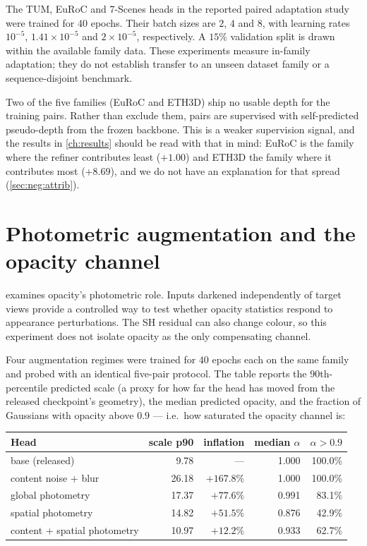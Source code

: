 The TUM, EuRoC and 7-Scenes heads in the reported paired adaptation study
were trained for $40$ epochs. Their batch sizes are $2$, $4$ and $8$, with
learning rates $10^{-5}$, $1.41\times10^{-5}$ and $2\times10^{-5}$,
respectively. A $15\%$ validation split is drawn within the available family
data. These experiments measure in-family adaptation; they do not establish
transfer to an unseen dataset family or a sequence-disjoint benchmark.

Two of the five families (EuRoC and ETH3D) ship no usable depth for the
training pairs. Rather than exclude them, pairs are supervised with
self-predicted pseudo-depth from the frozen backbone. This is a weaker
supervision signal, and the results in \cref{ch:results} should be read with
that in mind: EuRoC is the family where the refiner contributes least
($+1.00$\dB) and ETH3D the family where it contributes most ($+8.69$\dB),
and we do not have an explanation for that spread
(\cref{sec:neg:attrib}).

\section{Photometric augmentation and the opacity channel}
\label{sec:adapt:aug}

 examines opacity's photometric role. Inputs darkened
independently of target views provide a controlled way to test whether
opacity statistics respond to appearance perturbations. The SH residual
can also change colour, so this experiment does not isolate opacity as the
only compensating channel.

Four augmentation regimes were trained for $40$ epochs each on the same family
and probed with an identical five-pair protocol. The table reports the
$90$th-percentile predicted scale (a proxy for how far the head has moved from
the released checkpoint's geometry), the median predicted opacity, and the
fraction of Gaussians with opacity above $0.9$ --- i.e.\ how saturated the
opacity channel is:

\begin{center}
\small
\begin{tabular}{@{}lrrrr@{}}
\toprule
Head & scale p90 & inflation & median $\alpha$ & $\alpha>0.9$ \\
\midrule
base (released)              & \phantom{0}9.78 & ---       & 1.000 & 100.0\% \\
content noise + blur         & 26.18 & $+167.8\%$ & 1.000 & 100.0\% \\
global photometry            & 17.37 & $+77.6\%$  & 0.991 & \phantom{0}83.1\% \\
spatial photometry           & 14.82 & $+51.5\%$  & 0.876 & \phantom{0}42.9\% \\
content + spatial photometry & 10.97 & $+12.2\%$  & 0.933 & \phantom{0}62.7\% \\
\bottomrule
\end{tabular}
\end{center}

